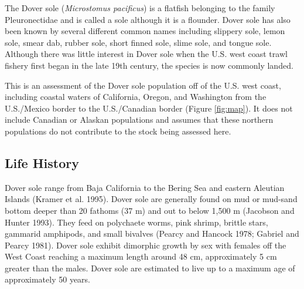 \documentclass[11pt,
  english,
  a4paper,
]{article}
\begin{document}
\leavevmode\tagmcend\tagstructend


The Dover sole (\emph{Microstomus pacificus}) is a flatfish belonging to the family Pleuronectidae and is called a sole although it is a flounder. Dover sole has also been known by several different common names including slippery sole, lemon sole, smear dab, rubber sole, short finned sole, slime sole, and tongue sole. Although there was little interest in Dover sole when the U.S. west coast trawl fishery first began in the late 19th century, the species is now commonly landed.

\leavevmode\tagmcend\tagstructend\par


This is an assessment of the Dover sole population off of the U.S. west coast, including coastal waters of California, Oregon, and Washington from the U.S./Mexico border to the U.S./Canadian border (Figure \ref{fig:map}). It does not include Canadian or Alaskan populations and assumes that these northern populations do not contribute to the stock being assessed here.

\leavevmode\tagmcend\tagstructend\par


\hypertarget{life-history}{%
\subsection{Life History}\label{life-history}}

\leavevmode\tagmcend\tagstructend


Dover sole range from Baja California to the Bering Sea and eastern Aleutian Islands {(Kramer et al. 1995)\leavevmode\tagmcend\tagstructend}. Dover sole are generally found on mud or mud-sand bottom deeper than 20 fathoms (37 m) and out to below 1,500 m {(Jacobson and Hunter 1993)\leavevmode\tagmcend\tagstructend}. They feed on polychaete worms, pink shrimp, brittle stars, gammarid amphipods, and small bivalves {(Pearcy and Hancock 1978; Gabriel and Pearcy 1981)\leavevmode\tagmcend\tagstructend}. Dover sole exhibit dimorphic growth by sex with females off the West Coast reaching a maximum length around 48 cm, approximately 5 cm greater than the males. Dover sole are estimated to live up to a maximum age of approximately 50 years.
\end{document}
